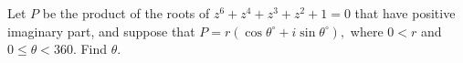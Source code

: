 Let $P$ be the product of the roots of $z^6+z^4+z^3+z^2+1=0$ that have positive imaginary part, and suppose that $P=r(\cos \theta^\circ+i\sin \theta^\circ),$ where $0<r$ and $0\le \theta <360.$  Find $\theta.$